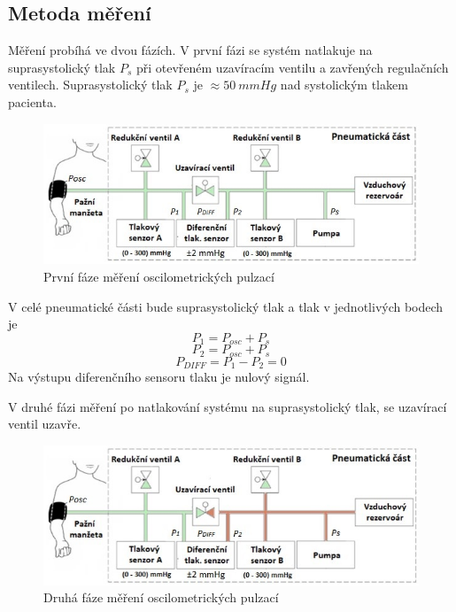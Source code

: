 \subsection{Metoda měření} \label{section:metoda_mereni}
Měření probíhá ve dvou fázích. V první fázi se systém natlakuje na suprasystolický tlak $P_s$ při otevřeném uzavíracím ventilu a zavřených regulačních ventilech. Suprasystolický tlak $P_s$ je $\approx 50 \ mmHg$ nad systolickým tlakem pacienta.
\begin{figure}[H]
    \includegraphics[width=1\linewidth]{pictures/faze_mereni_1.jpg}
    \caption{První fáze měření oscilometrických pulzací \cite{cite:Habilitace}}
\end{figure}
V celé pneumatické části bude suprasystolický tlak a tlak v jednotlivých bodech je
\begin{equation*}
    P_1 = P_{osc} + P_s
\end{equation*}
\begin{equation*}
    P_2 = P_{osc} + P_s
\end{equation*}
\begin{equation*}
    P_{DIFF} = P_1 - P_2 = 0
\end{equation*}
Na výstupu diferenčního sensoru tlaku je nulový signál. \par
V druhé fázi měření po natlakování systému na suprasystolický tlak, se uzavírací ventil uzavře.
\begin{figure}[H]
    \includegraphics[width=1\linewidth]{pictures/faze_mereni_2.jpg}
    \caption{Druhá fáze měření oscilometrických pulzací \cite{cite:Habilitace}}
\end{figure}
